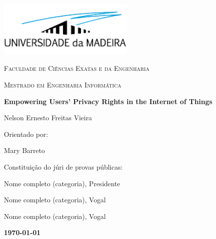 %
%
\begin{titlepage}
    \centering
    \addtolength{\hoffset}{0.5cm}
        \centering
        \includegraphics[width=0.50\textwidth]{assets/images/uma_logo.png}\par\vspace{0.5cm}
        {\scshape\LARGE {} Faculdade de Ciências Exatas e da Engenharia \par}
        \vspace{1cm}
        {\scshape\Large Mestrado em Engenharia Informática \par}
        \vspace{1.5cm}
        {\huge\bfseries Empowering Users' Privacy Rights in the Internet of Things \par}
        \vspace{2cm}
        {\Large Nelson Ernesto Freitas Vieira\par}
        \vfill
        {\large Orientado por: \par}
            Mary Barreto \par
        \vfill
        {\large Constituição do júri de provas públicas: \par}
            Nome completo (categoria), Presidente \par
            Nome completo (categoria), Vogal \par
            Nome completo (categoria), Vogal \par
        \vfill
        {\large \bfseries \today \par}
    \end{titlepage}
